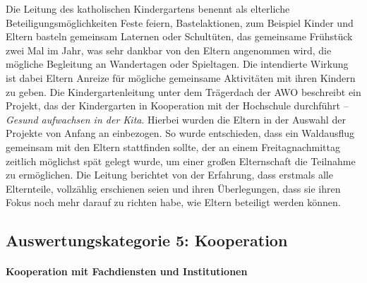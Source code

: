 Die Leitung des katholischen Kindergartens benennt als elterliche Beteiligungsmöglichkeiten Feste feiern, Bastelaktionen, zum Beispiel Kinder und Eltern basteln gemeinsam Laternen oder Schultüten, das gemeinsame Frühstück zwei Mal im Jahr, was sehr dankbar von den Eltern angenommen wird, die mögliche Begleitung an Wandertagen oder Spieltagen. Die intendierte Wirkung ist dabei Eltern Anreize für mögliche gemeinsame Aktivitäten mit ihren Kindern zu geben. 
Die Kindergartenleitung unter dem Trägerdach der AWO beschreibt ein Projekt, das der Kindergarten in Kooperation mit der Hochschule durchführt -- \emph{Gesund aufwachsen in der Kita}. Hierbei wurden die Eltern in der Auswahl der Projekte von Anfang an einbezogen. So wurde entschieden, dass ein Waldausflug gemeinsam mit den Eltern stattfinden sollte, der an einem Freitagnachmittag zeitlich möglichst spät gelegt wurde, um einer großen Elternschaft die Teilnahme zu ermöglichen. Die Leitung berichtet von der Erfahrung, dass erstmals alle Elternteile, vollzählig erschienen seien und ihren Überlegungen, dass sie ihren Fokus noch mehr darauf zu richten habe, wie Eltern beteiligt werden können.  

\subsection{Auswertungskategorie 5: Kooperation}

\paragraph{Kooperation mit Fachdiensten und Institutionen}

